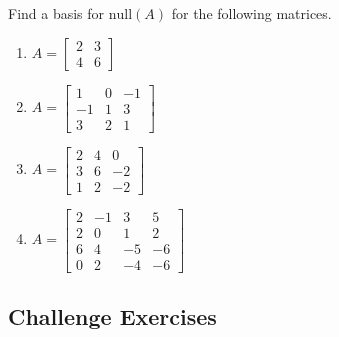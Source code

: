 \documentclass{ximera}
\begin{document}
\begin{problem}\label{prb:5.38} Find a basis for $\mbox{null} \left(A \right)$ for the following matrices.

\begin{enumerate}
\item
$A = \left[ \begin{array}{rr}
2 & 3 \\
4 & 6
\end{array} \right] $

\item
$A = \left[ \begin{array}{rrr}
1 & 0 & -1 \\
-1 & 1 & 3 \\
3 & 2 & 1
\end{array} \right]$

\item
$A = \left[ \begin{array}{rrr}
2 & 4 & 0 \\
3 & 6 & -2 \\
1 & 2 & -2
\end{array} \right]$

\item
$ A = \left[ \begin{array}{rrrr}
2 & -1 & 3 & 5 \\
2 & 0 & 1 & 2 \\
6 & 4 & -5 & -6 \\
0 & 2 & -4 & -6
\end{array} \right]$

\end{enumerate}
\end{problem}

\subsection*{Challenge Exercises}
\end{document}
